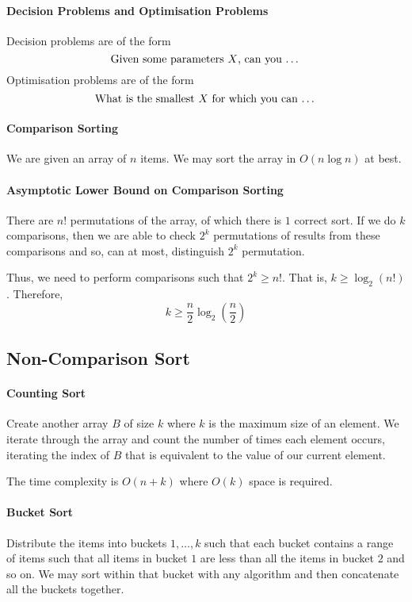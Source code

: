 \paragraph{Decision Problems and Optimisation Problems}
Decision problems are of the form
\[\text{Given some parameters \(X\), can you \dots}\]
Optimisation problems are of the form
\[\text{What is the smallest \(X\) for which you can \dots}\]

\paragraph{Comparison Sorting}
We are given an array of \(n\) items. We may sort the array in \(O(n\log n)\)
at best.

\paragraph{Asymptotic Lower Bound on Comparison Sorting}

There are \(n!\) permutations of the array, of which there is \(1\) correct sort.
If we do \(k\) comparisons, then we are able to check \(2^k\) permutations of results from these comparisons and so, can at most, distinguish \(2^k\) permutation.

Thus, we need to perform comparisons such that 
\(2^k \geq n!\).
That is,
\(k\geq \log_2 (n!)\).
Therefore, \[
    k \geq \frac{n}{2}\log_2 \left(\frac{n}{2}\right)
\]

\subsection{Non-Comparison Sort}

\paragraph{Counting Sort}
Create another array \(B\) of size \(k\) where \(k\) is 
the maximum size of an element.
We iterate through the array and count the number of times each element occurs, iterating the index of \(B\) that is equivalent to the value of our current element.

The time complexity is \(O(n + k)\) where \(O(k)\) space is required.

\paragraph{Bucket Sort}

Distribute the items into buckets \(1, \dots, k\) such that each bucket contains a range of items such that all items in bucket \(1\) are less than all the items in bucket \(2\) and so on. We may sort within that bucket with any algorithm and then concatenate all the buckets together.

